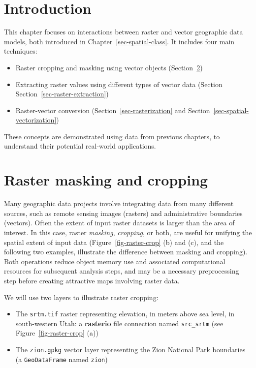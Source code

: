 \documentclass[
  letterpaper,
]{krantz}
\providecommand{\tightlist}{%
  \setlength{\itemsep}{0pt}\setlength{\parskip}{0pt}}\usepackage{longtable,booktabs,array}
\begin{document}
\section{Introduction}\label{introduction-4}

This chapter focuses on interactions between raster and vector
geographic data models, both introduced in
Chapter~\ref{sec-spatial-class}. It includes four main techniques:

\begin{itemize}
\tightlist
\item
  Raster cropping and masking using vector objects
  (Section~\ref{sec-raster-cropping})
\item
  Extracting raster values using different types of vector data (Section
  Section~\ref{sec-raster-extraction})
\item
  Raster-vector conversion (Section~\ref{sec-rasterization} and
  Section~\ref{sec-spatial-vectorization})
\end{itemize}

These concepts are demonstrated using data from previous chapters, to
understand their potential real-world applications.

\section{Raster masking and cropping}\label{sec-raster-cropping}

Many geographic data projects involve integrating data from many
different sources, such as remote sensing images (rasters) and
administrative boundaries (vectors). Often the extent of input raster
datasets is larger than the area of interest. In this case, raster
\emph{masking}, \emph{cropping}, or both, are useful for unifying the
spatial extent of input data (Figure~\ref{fig-raster-crop} (b) and (c),
and the following two examples, illustrate the difference between
masking and cropping). Both operations reduce object memory use and
associated computational resources for subsequent analysis steps, and
may be a necessary preprocessing step before creating attractive maps
involving raster data.

We will use two layers to illustrate raster cropping:

\begin{itemize}
\tightlist
\item
  The \texttt{srtm.tif} raster representing elevation, in meters above
  sea level, in south-western Utah: a \textbf{rasterio} file connection
  named \texttt{src\_srtm} (see Figure~\ref{fig-raster-crop} (a))
\item
  The \texttt{zion.gpkg} vector layer representing the Zion National
  Park boundaries (a \texttt{GeoDataFrame} named \texttt{zion})
\end{itemize}
\end{document}

